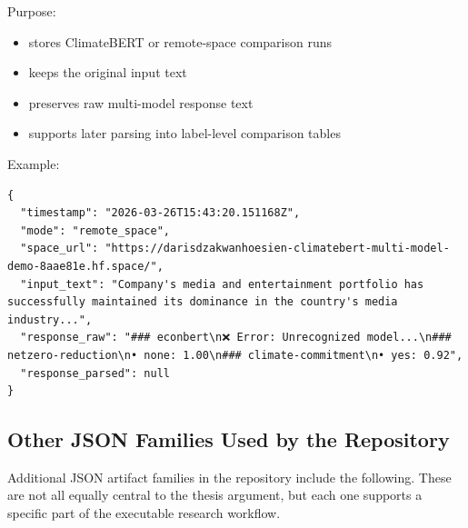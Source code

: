 Purpose:

\begin{itemize}
\tightlist
\item
  stores ClimateBERT or remote-space comparison runs
\item
  keeps the original input text
\item
  preserves raw multi-model response text
\item
  supports later parsing into label-level comparison tables
\end{itemize}

Example:

\begin{verbatim}
{
  "timestamp": "2026-03-26T15:43:20.151168Z",
  "mode": "remote_space",
  "space_url": "https://darisdzakwanhoesien-climatebert-multi-model-demo-8aae81e.hf.space/",
  "input_text": "Company's media and entertainment portfolio has successfully maintained its dominance in the country's media industry...",
  "response_raw": "### econbert\n❌ Error: Unrecognized model...\n### netzero-reduction\n• none: 1.00\n### climate-commitment\n• yes: 0.92",
  "response_parsed": null
}
\end{verbatim}

\subsection{Other JSON Families Used by the Repository}\label{other-json-families-used-by-the-repository}

Additional JSON artifact families in the repository include the following. These are not all equally central to the thesis argument, but each one supports a specific part of the executable research workflow.

